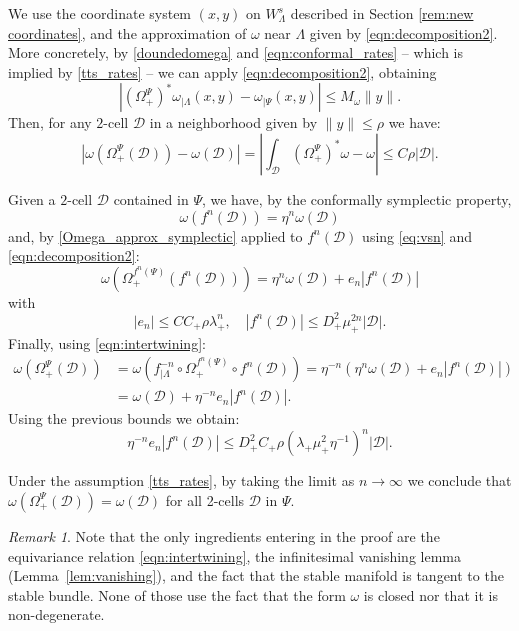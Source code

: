 \documentclass[11pt]{amsart}
\theoremstyle{definition}
\theoremstyle{remark}
\newtheorem{rem}[thm]{Remark}
\numberwithin{equation}{section}
\begin{document}
We use the coordinate system $(x,y)$ on $W^s_\Lambda$ described in Section \ref{rem:new coordinates}, and the approximation of $\omega$ near $\Lambda$ given by \eqref{eqn:decomposition2}.
More concretely, by \eqref{doundedomega} and \eqref{eqn:conformal_rates} -- which is implied by \eqref{tts_rates} --  we can apply \eqref{eqn:decomposition2}, obtaining
\[
|(\Omega^\Psi_+)^* \omega_{\mid\Lambda} (x,y)-\omega_{\mid \Psi}(x,y)|\le  M_\omega \|y\|.
\]
Then,  for any $2$-cell $\mathscr{D}$  in a neighborhood given
by $\|y\| \le \rho$ we have:
\begin{equation}
  \label{Omega_approx_symplectic}
| \omega( \Omega_+^\Psi (\mathscr{D}) )  - \omega(\mathscr{D}) |= \left|\int _\mathscr{D}  (\Omega^\Psi_+)^* \omega-\omega \right| \le C \rho |\mathscr{D}| .
\end{equation}



Given a $2$-cell $\mathscr{D}$ contained in $\Psi$, we
have, by the conformally symplectic property,
\[
\omega( f^n(\mathscr{D}) ) = \eta^n  \omega(\mathscr{D})
\]
and, by  \eqref{Omega_approx_symplectic} applied to $f^n(\mathscr{D}) $ using \eqref{eq:vsn} and \eqref{eqn:decomposition2}:
\begin{equation}\label{eqn:area}
\omega( \Omega_+^{f^n(\Psi)} (f^n(\mathscr{D}))) =
\eta^n  \omega(\mathscr{D}) + e_n |f^n(\mathscr{D})|
\end{equation}
with
\[
|e_n| \le C C_+ \rho  \lambda_+^n, \quad |f^n(\mathscr{D})| \le D_+^2\mu_+^{2n} |\mathscr{D}| .
\]
Finally, using \eqref{eqn:intertwining}:
\[
\begin{split}
\omega(\Omega_+^{\Psi}(\mathscr{D})) &=
\omega( f_{\mid\Lambda}^{-n} \circ \Omega_+^{f^n(\Psi)} \circ  f^n(\mathscr{D}) ) =
\eta^{-n}\left(  \eta^n  \omega(\mathscr{D})  +  e_n  |f^n(\mathscr{D})| \right)\\
&= \omega(\mathscr{D}) + \eta^{-n}e_n  |f^n(\mathscr{D})| .
\end{split}
\]
Using the previous bounds we obtain:
\[
 \eta^{-n} e_n  |f^n(\mathscr{D})| \le D_+^2 C_+ \rho (\lambda_+\mu_+^2\eta ^{-1})^n |\mathscr{D}| .
\]

Under the assumption \eqref{tts_rates},
by taking the limit as $n \to \infty$ we conclude that
$\omega(\Omega^{\Psi}_+(\mathscr{D})) = \omega(\mathscr{D})$ for all 2-cells $\mathscr{D}$ in $\Psi$.

\begin{rem}
Note that the only ingredients entering in the
proof are the equivariance relation \eqref{eqn:intertwining},
the infinitesimal vanishing lemma (Lemma~\ref{lem:vanishing}), and the fact that the stable manifold
is tangent to the stable bundle. None of those use
the fact that the form $\omega$ is closed nor that it is
non-degenerate.
\end{rem}
\end{document}
